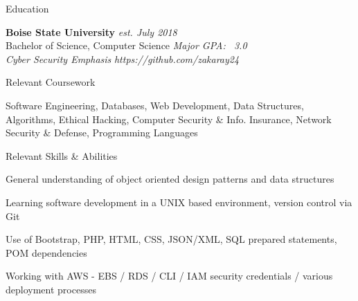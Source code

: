 \documentclass{resume}
\begin{document}

\begin{rSection}{Education}

{\bf Boise State University} \hfill {\em est. July 2018}\\
Bachelor of Science, Computer Science \hfill {\em Major GPA: ~3.0}\\
\emph{Cyber Security Emphasis} \hfill {\em https://github.com/zakaray24}\\

\end{rSection}




\begin{rSection}{Relevant Coursework}

Software Engineering, Databases, Web Development, Data Structures, Algorithms,
 Ethical Hacking, Computer Security \& Info. Insurance, Network Security \& Defense, Programming Languages

\end{rSection}



\begin{rSection}{Relevant Skills \& Abilities}

 General understanding of object oriented design patterns and data structures\par
 Learning software development in a UNIX based environment, version control via Git\par
 Use of Bootstrap, PHP, HTML, CSS, JSON/XML, SQL prepared statements, POM dependencies\par
 Working with AWS - EBS / RDS / CLI / IAM security credentials / various deployment processes

\end{rSection}
\end{document}
